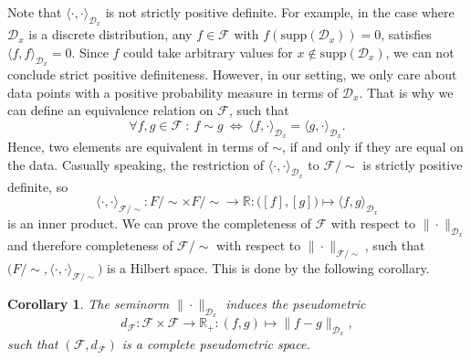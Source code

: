 \documentclass[11pt, a4paper]{article}
\newtheorem{corollary}[theorem]{Corollary}
\newcommand{\R}{\mathbb{R}}
\newcommand{\D}{\mathcal{D}}
\newcommand{\F}{\mathcal{F}}
\begin{document}
Note that $\langle \cdot, \cdot \rangle_{\D_x}$ is not strictly positive definite. For example, in the case where $\D_x$ is a discrete distribution, any $f \in \F$ with $f(\text{supp}(\D_x)) = 0$, satisfies $\langle f, f \rangle_{\D_x} = 0$. Since $f$ could take arbitrary values for $x \notin \text{supp}(\D_x)$, we can not conclude strict positive definiteness. However, in our setting, we only care about data points with a positive probability measure in terms of $\D_x$. That is why we can define an equivalence relation on $\F$, such that
\[ \forall f,g \in \F \ : \ f \sim g \ \Leftrightarrow \ \langle f, \cdot \rangle_{\D_x} = \langle g, \cdot \rangle_{\D_x}. \]
Hence, two elements are equivalent in terms of $\sim$, if and only if they are equal on the data. Casually speaking, the restriction of $\langle \cdot, \cdot \rangle_{\D_x}$ to $\F / {\sim}$ is strictly positive definite, so
\[ \langle \cdot, \cdot \rangle_{\F/{\sim}} : F/{\sim} \times F/{\sim} \to \R : \big ([f],[g] \big ) \mapsto \langle f , g \rangle_{\D_x} \]
is an inner product. We can prove the completeness of $\F$ with respect to $\| \cdot \|_{\D_x}$ and therefore completeness of $\F / {\sim}$ with respect to $\| \cdot \|_{\F/{\sim}}$, such that $\big ( F /{\sim}, \langle \cdot, \cdot \rangle_{\F/{\sim}} \big )$ is a Hilbert space. This is done by the following corollary.

\begin{corollary}
The seminorm $\| \cdot \|_{\D_x}$ induces the pseudometric
\[ d_{\F}: \F \times \F \to \R_+ : (f,g) \mapsto \big \| f-g \big \|_{\D_x}, \]
such that $(\F,d_{\F})$ is a complete pseudometric space.
\end{corollary}
\end{document}

